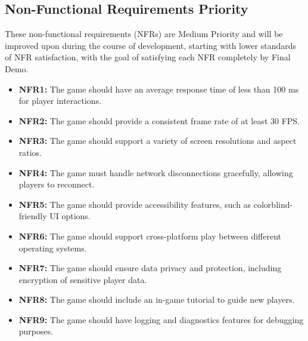 \subsection{Non-Functional Requirements Priority}
These non-functional requirements (NFRs) are Medium Priority and will be improved upon during the course of development, starting with lower standards of NFR satisfaction, with the goal of satisfying each NFR completely by Final Demo.
\begin{itemize}
    \item \textbf{NFR1:} The game should have an average response time of less than 100 ms for player interactions.
    \item \textbf{NFR2:} The game should provide a consistent frame rate of at least 30 FPS.
    \item \textbf{NFR3:} The game should support a variety of screen resolutions and aspect ratios.
    \item \textbf{NFR4:} The game must handle network disconnections gracefully, allowing players to reconnect.
    \item \textbf{NFR5:} The game should provide accessibility features, such as colorblind-friendly UI options.
    \item \textbf{NFR6:} The game should support cross-platform play between different operating systems.
    \item \textbf{NFR7:} The game should ensure data privacy and protection, including encryption of sensitive player data.
    \item \textbf{NFR8:} The game should include an in-game tutorial to guide new players.
    \item \textbf{NFR9:} The game should have logging and diagnostics features for debugging purposes.
\end{itemize}

